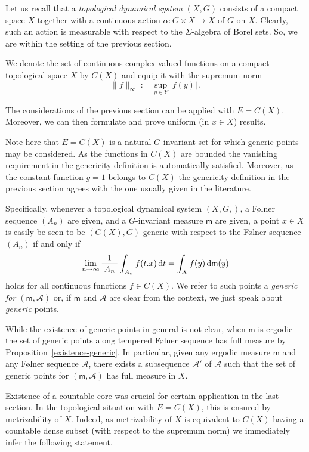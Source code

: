 \documentclass [14pt]{amsart}
\numberwithin{equation}{section}
\newcommand{\cA}{{\mathcal A}}
\newcommand{\mm}{\mathsf{m}}
\newcommand{\dd}{\mbox{\rm d}}
\begin{document}
Let us recall that a \textit{topological dynamical system} $(X,G)$ consists of a compact space $X$ together with a continuous  action $\alpha :  G\times X\longrightarrow X$ of $G$ on $X$.
Clearly, such an action is measurable with respect to the $\Sigma$-algebra of Borel sets. So, we are within the setting of the previous section.

We denote the set of continuous complex valued functions on a compact  topological space $X$ by $C(X)$ and equip it with the supremum norm
$$\|f\|_\infty :=\sup_{y\in Y} |f(y)| \,.$$


\medskip

The considerations of the previous section can  be applied with $E = C(X)$. Moreover, we can then formulate and prove uniform (in $x\in X$) results.

Note here that  $E = C(X)$ is a natural $G$-invariant set for which generic points may be considered. As the functions in $C(X)$ are bounded the vanishing requirement in the genericity definition is automatically satisfied. Moreover, as the constant function $g = 1$ belongs to $C(X)$ the genericity definition in the previous section agrees with the one usually given in the literature.

Specifically, whenever a topological  dynamical system $(X,G,)$, a F\o lner sequence
$(A_n)$ are given, and a $G$-invariant measure $\mm$ are given, a point $x\in X$ is easily be seen to be $(C(X),G)$-generic
with respect to the F\o lner sequence $(A_n)$  if and only if
\begin{equation}\label{eq-birk-et}
\lim_{n\to \infty} \frac{1}{|A_n|} \int_{A_n} f(t .x)\, \dd t =
\int_X  f(y) \, \dd \mm(y)
\end{equation}
holds for all continuous functions $f \in C(X)$. We refer to such points a \textit{generic for $(\mm,\mathcal{A})$} or, if $\mm$ and $\mathcal{A}$ are clear from the context, we just speak  about \textit{generic} points.

While the existence of generic points in general is not clear, when $\mm$ is ergodic the set of generic points along tempered F\o lner sequence has full measure by Proposition~\ref{existence-generic}. In particular, given any
ergodic measure $\mm$ and any F\o lner sequence $\cA$, there exists a subsequence $\cA'$ of $\cA$ such that the set of generic points for $(\mm,\mathcal{A})$ has full measure in $X$.

\medskip

Existence of a countable core was crucial for certain application in the last section. In the topological situation with $E = C(X)$, this is ensured by metrizability of $X$.  Indeed, as metrizability of $X$ is equivalent to $C(X)$ having a countable dense subset  (with respect to the supremum norm) we immediately infer the following statement.
\end{document}

